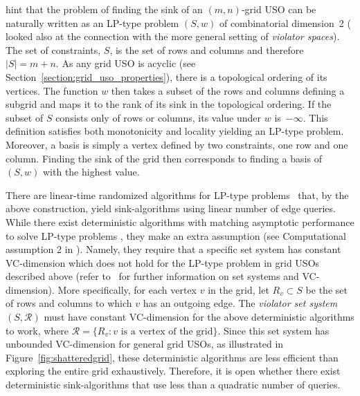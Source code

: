 \documentclass[runningheads,a4paper]{llncs}
\newcommand{\sinkalgs}{sink-algorithms\xspace}
\begin{document}
\citet{grid08} hint that the problem of finding the sink of an $(m,n)$-grid USO can be naturally written as an LP-type problem $(S,w)$ of combinatorial dimension~2 (\citet{DBLP:journals/dam/GartnerMRS08} looked also at the connection with the more general setting of \emph{violator spaces}). 
The set of constraints, $S$, is the set of rows and columns and therefore $|S| = m + n$. As any grid USO is acyclic (see Section~\ref{section:grid_uso_properties}), there is a topological ordering of its vertices. 
The function $w$ then takes a subset of the rows and columns defining a subgrid and maps it to the rank of its sink in the topological ordering. 
If the subset of $S$ consists only of rows or columns, its value under $w$ is~$-\infty$. 
This definition satisfies both monotonicity and locality yielding an LP-type problem.
Moreover, a basis is simply a vertex defined by two constraints, one row and one column.
Finding the sink of the grid then corresponds to finding a basis of $(S,w)$ with the highest value.

There are linear-time randomized algorithms for LP-type problems~\cite{MatousekSW96} that, by the above construction, yield \sinkalgs using linear number of edge queries. 
While there exist deterministic algorithms with matching asymptotic performance to solve LP-type problems \cite{chan16,ChazelleM96}, they make an extra assumption  
(see Computational assumption 2 in \cite{ChazelleM96}). 
Namely, they require that a specific set system has constant VC-dimension which does not hold for the LP-type problem in grid USOs described above (refer to~\cite{matouvsek2002lectures} for further information on set systems and VC-dimension). More specifically, for each vertex $v$ in the grid, let $R_v\subset S$ be the set of rows and columns to which $v$ has an outgoing edge. 
The \emph{violator set system} $(S, \mathcal R)$ must have constant VC-dimension for the above deterministic algorithms to work, where $\mathcal R = \{R_v : v\text{ is a vertex of the grid}\}$. 
Since this set system has unbounded VC-dimension for general grid USOs, as illustrated in Figure~\ref{fig:shatteredgrid}, these deterministic algorithms are less efficient than exploring the entire grid exhaustively. 
Therefore, it is open whether there exist deterministic \sinkalgs that use less than a quadratic number of queries. 
\end{document}
